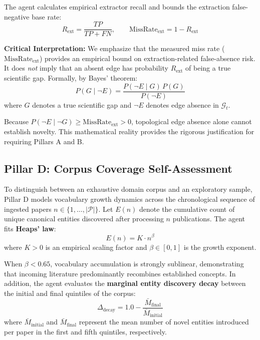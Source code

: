 \documentclass[conference,10pt]{IEEEtran}
\begin{document}
The agent calculates empirical extractor recall and bounds the extraction false-negative base rate:
\begin{equation}
R_{\text{ext}} = \frac{TP}{TP + FN}, \qquad \mathrm{MissRate}_{\text{ext}} = 1 - R_{\text{ext}}
\end{equation}

\textbf{Critical Interpretation:} We emphasize that the measured miss rate ($\mathrm{MissRate}_{\text{ext}}$) provides an empirical bound on extraction-related false-absence risk. It does \emph{not} imply that an absent edge has probability $R_{\text{ext}}$ of being a true scientific gap. Formally, by Bayes' theorem:
\begin{equation}
P(G \mid \neg E) = \frac{P(\neg E \mid G) \, P(G)}{P(\neg E)}
\end{equation}
where $G$ denotes a true scientific gap and $\neg E$ denotes edge absence in $\mathcal{G}_t$.

Because $P(\neg E \mid \neg G) \ge \mathrm{MissRate}_{\text{ext}} > 0$, topological edge absence alone cannot establish novelty. This mathematical reality provides the rigorous justification for requiring Pillars A and B.

\subsection{Pillar D: Corpus Coverage Self-Assessment}
To distinguish between an exhaustive domain corpus and an exploratory sample, Pillar D models vocabulary growth dynamics across the chronological sequence of ingested papers $n \in \{1, \dots, |\mathcal{P}|\}$. Let $E(n)$ denote the cumulative count of unique canonical entities discovered after processing $n$ publications. The agent fits \textbf{Heaps' law}:
\begin{equation}
E(n) = K \cdot n^\beta
\end{equation}
where $K > 0$ is an empirical scaling factor and $\beta \in [0, 1]$ is the growth exponent.

When $\beta < 0.65$, vocabulary accumulation is strongly sublinear, demonstrating that incoming literature predominantly recombines established concepts. In addition, the agent evaluates the \textbf{marginal entity discovery decay} between the initial and final quintiles of the corpus:
\begin{equation}
\Delta_{\text{decay}} = 1.0 - \frac{\bar{M}_{\text{final}}}{\bar{M}_{\text{initial}}}
\end{equation}
where $\bar{M}_{\text{initial}}$ and $\bar{M}_{\text{final}}$ represent the mean number of novel entities introduced per paper in the first and fifth quintiles, respectively.
\end{document}
